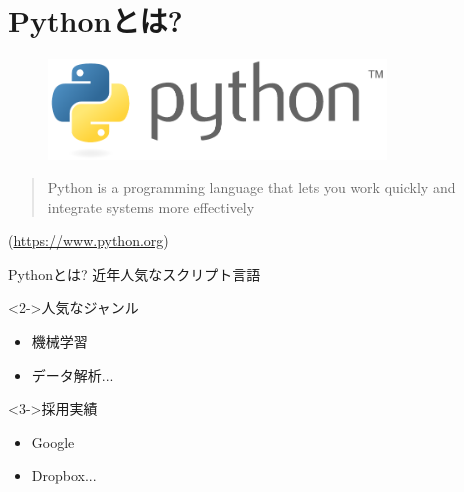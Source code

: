 \documentclass[12pt, dvipdfmx]{beamer}
\begin{document}
\section{Pythonとは?}
\begin{frame}
    \begin{figure}[htbp]
        \centering
        \includegraphics[width=0.8\textwidth]{img/pythonlogo.pdf}
    \end{figure}
    \begin{quote}
        Python is a programming language that lets you work quickly and integrate systems more effectively
    \end{quote}
    \begin{flushright}
        (\url{https://www.python.org})
    \end{flushright}
\end{frame}
\begin{frame}{Pythonとは?}
    近年人気なスクリプト言語

    \begin{block}<2->{人気なジャンル}
        \begin{itemize}
            \item 機械学習
            \item データ解析...
        \end{itemize}
    \end{block}

    \begin{block}<3->{採用実績}
        \begin{itemize}
            \item Google
            \item Dropbox...
        \end{itemize}
    \end{block}
\end{frame}
\end{document}
